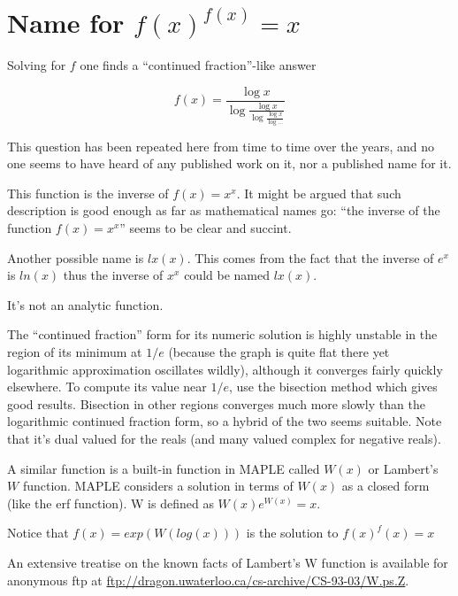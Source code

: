 \section{Name for $f(x)^{f(x)}=x$}


Solving for $f$ one finds a ``continued fraction''-like answer

\begin{equation}
    f(x) = \frac{\log x}{\log
               \frac{\log x}{\log
                \frac{\log x}{\log\ldots } } }
\end{equation}

This question has been repeated here from time to time over the years,
and no one seems to have heard of any published work on it, nor a
published name for it.


This function is the inverse of $f(x)=x^x$. It might be argued that such
description is good enough as far as mathematical names go: ``the
inverse of the function $f(x)=x^x$'' seems to be clear and succint.

Another possible name is $lx(x)$. This comes from the fact that the
inverse of $e^x$ is $ln(x)$ thus the inverse of $x^x$ could be named
$lx(x)$.



It's not an analytic function.

The ``continued fraction'' form for its numeric solution is highly
unstable in the region of its minimum at $1/e$ (because the graph is
quite flat there yet logarithmic approximation oscillates wildly),
although it converges fairly quickly elsewhere. To compute its value
near $1/e$, use the bisection method which gives good results. Bisection
in other regions converges much more slowly than the logarithmic
continued fraction form, so a hybrid of the two seems suitable.  Note
that it's dual valued for the reals (and many valued complex for
negative reals).

A similar function is a built-in function in MAPLE called $W(x)$ or
Lambert's $W$ function.  MAPLE considers a solution in terms of $W(x)$
as a closed form (like the erf function). W is defined as
$W(x)e^{W(x)}=x$.

Notice that $f(x) = exp(W(log(x)))$ is the solution to $f(x)^f(x)=x$

An extensive treatise on the known facts of Lambert's W function is
available for anonymous ftp at
\url{ftp://dragon.uwaterloo.ca/cs-archive/CS-93-03/W.ps.Z}.
